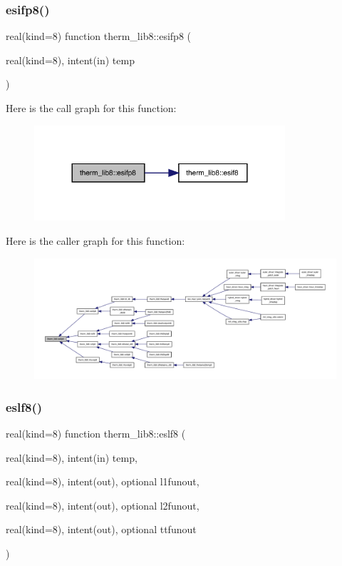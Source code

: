 \subsubsection{\texorpdfstring{esifp8()}{esifp8()}}
{\footnotesize\ttfamily real(kind=8) function therm\+\_\+lib8\+::esifp8 (\begin{DoxyParamCaption}\item[{real(kind=8), intent(in)}]{temp }\end{DoxyParamCaption})}

Here is the call graph for this function\+:
\nopagebreak
\begin{figure}[H]
\begin{center}
\leavevmode
\includegraphics[width=264pt]{namespacetherm__lib8_a73a640719683dd2b05aba5a87822aa22_cgraph}
\end{center}
\end{figure}
Here is the caller graph for this function\+:
\nopagebreak
\begin{figure}[H]
\begin{center}
\leavevmode
\includegraphics[width=350pt]{namespacetherm__lib8_a73a640719683dd2b05aba5a87822aa22_icgraph}
\end{center}
\end{figure}
\mbox{\label{namespacetherm__lib8_aa7a527bdf772238306801f7f86e6db58}} 
\subsubsection{\texorpdfstring{eslf8()}{eslf8()}}
{\footnotesize\ttfamily real(kind=8) function therm\+\_\+lib8\+::eslf8 (\begin{DoxyParamCaption}\item[{real(kind=8), intent(in)}]{temp,  }\item[{real(kind=8), intent(out), optional}]{l1funout,  }\item[{real(kind=8), intent(out), optional}]{l2funout,  }\item[{real(kind=8), intent(out), optional}]{ttfunout }\end{DoxyParamCaption})}

